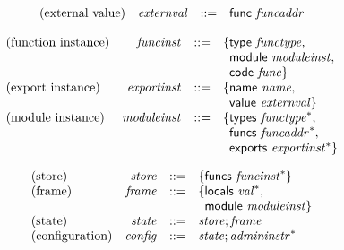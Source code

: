 \documentclass{article}
\begin{document}
\vspace{1ex}

$$
\begin{array}{@{}lrrl@{}l@{}}
	\mbox{(external value)} & {\mathit{externval}} &::=& \mathsf{func}~{\mathit{funcaddr}} \\
\end{array}
$$

\vspace{1ex}

\vspace{1ex}

$$
\begin{array}{@{}lrrl@{}l@{}}
	\mbox{(function instance)} & {\mathit{funcinst}} &::=& \{ \begin{array}[t]{@{}l@{}l@{}}
		\mathsf{type}~{\mathit{functype}},\; \\
		\mathsf{module}~{\mathit{moduleinst}},\; \\
		\mathsf{code}~{\mathit{func}} \}\end{array} \\
	\mbox{(export instance)} & {\mathit{exportinst}} &::=& \{ \begin{array}[t]{@{}l@{}l@{}}
		\mathsf{name}~{\mathit{name}},\; \\
		\mathsf{value}~{\mathit{externval}} \}\end{array} \\
	\mbox{(module instance)} & {\mathit{moduleinst}} &::=& \{ \begin{array}[t]{@{}l@{}l@{}}
		\mathsf{types}~{{\mathit{functype}}^\ast},\; \\
		\mathsf{funcs}~{{\mathit{funcaddr}}^\ast},\; \\
		\mathsf{exports}~{{\mathit{exportinst}}^\ast} \}\end{array} \\
\end{array}
$$

\vspace{1ex}

$$
\begin{array}{@{}lrrl@{}l@{}}
	\mbox{(store)} & {\mathit{store}} &::=& \{ \begin{array}[t]{@{}l@{}l@{}}
		\mathsf{funcs}~{{\mathit{funcinst}}^\ast} \}\end{array} \\
	\mbox{(frame)} & {\mathit{frame}} &::=& \{ \begin{array}[t]{@{}l@{}l@{}}
		\mathsf{locals}~{{\mathit{val}}^\ast},\; \\
		\mathsf{module}~{\mathit{moduleinst}} \}\end{array} \\
	\mbox{(state)} & {\mathit{state}} &::=& {\mathit{store}} ; {\mathit{frame}} \\
	\mbox{(configuration)} & {\mathit{config}} &::=& {\mathit{state}} ; {{\mathit{admininstr}}^\ast} \\
\end{array}
$$
\end{document}
